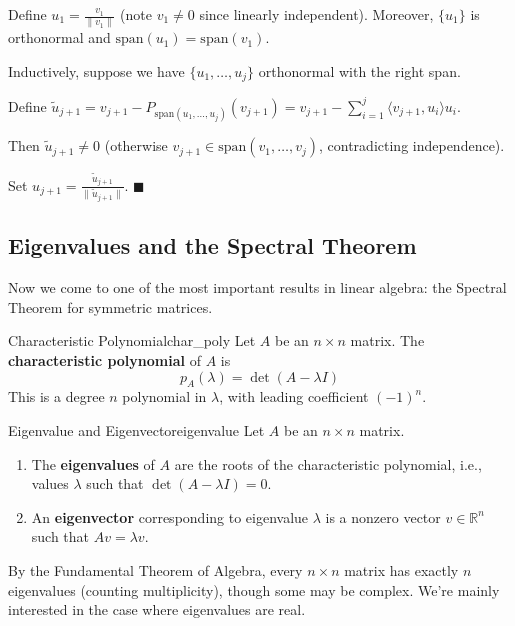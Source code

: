 \documentclass[11pt, letterpaper, openany]{book}
\renewenvironment{proof}[1][\proofname]{%
  \tcolorbox[blanker, breakable, left=1em,
    before skip=1em, after skip=1em,
    borderline west={2pt}{0pt}{MagicTeal!50},
    colback=MagicCream,
    before upper={\textcolor{MagicTeal}{\sffamily\bfseries #1.}\space}
  ]%
}{%
  \hfill\textcolor{MagicTeal}{\ensuremath{\blacksquare}}\endtcolorbox%
}
\begin{document}
\begin{proof}
Define $u_1 = \frac{v_1}{\|v_1\|}$ (note $v_1 \neq 0$ since linearly independent). Moreover, $\{u_1\}$ is orthonormal and $\text{span}(u_1) = \text{span}(v_1)$.

Inductively, suppose we have $\{u_1, \ldots, u_j\}$ orthonormal with the right span.

Define $\tilde{u}_{j+1} = v_{j+1} - P_{\text{span}(u_1,\ldots,u_j)}(v_{j+1}) = v_{j+1} - \sum_{i=1}^j \langle v_{j+1}, u_i \rangle u_i$.

Then $\tilde{u}_{j+1} \neq 0$ (otherwise $v_{j+1} \in \text{span}(v_1, \ldots, v_j)$, contradicting independence).

Set $u_{j+1} = \frac{\tilde{u}_{j+1}}{\|\tilde{u}_{j+1}\|}$.
\end{proof}

\subsection{Eigenvalues and the Spectral Theorem}

Now we come to one of the most important results in linear algebra: the Spectral Theorem for symmetric matrices.

\begin{defn}{Characteristic Polynomial}{char_poly}
Let $A$ be an $n \times n$ matrix. The \textbf{characteristic polynomial} of $A$ is
\[p_A(\lambda) = \det(A - \lambda I)\]
This is a degree $n$ polynomial in $\lambda$, with leading coefficient $(-1)^n$.
\end{defn}

\begin{defn}{Eigenvalue and Eigenvector}{eigenvalue}
Let $A$ be an $n \times n$ matrix.
\begin{enumerate}
    \item The \textbf{eigenvalues} of $A$ are the roots of the characteristic polynomial, i.e., values $\lambda$ such that $\det(A - \lambda I) = 0$.
    \item An \textbf{eigenvector} corresponding to eigenvalue $\lambda$ is a nonzero vector $v \in \mathbb{R}^n$ such that $Av = \lambda v$.
\end{enumerate}
\end{defn}

\begin{remark}
By the Fundamental Theorem of Algebra, every $n \times n$ matrix has exactly $n$ eigenvalues (counting multiplicity), though some may be complex. We're mainly interested in the case where eigenvalues are real.
\end{remark}
\end{document}

